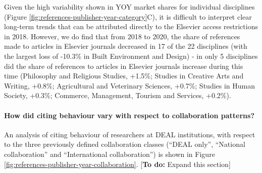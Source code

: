 \documentclass[
]{article}
\begin{document}
Given the high variability shown in YOY market shares for individual disciplines (Figure \ref{fig:references-publisher-year-category}C), it is difficult to interpret clear long-term trends that can be attributed directly to the Elsevier access restrictions in 2018. However, we do find that from 2018 to 2020, the share of references made to articles in Elsevier journals decreased in 17 of the 22 disciplines (with the largest loss of -10.3\% in Built Environment and Design) - in only 5 disciplines did the share of references to articles in Elsevier journals increase during this time (Philosophy and Religious Studies, +1.5\%; Studies in Creative Arts and Writing, +0.8\%; Agricultural and Veterinary Sciences, +0.7\%; Studies in Human Society, +0.3\%; Commerce, Management, Tourism and Services, +0.2\%).

\hypertarget{how-did-citing-behaviour-vary-with-respect-to-collaboration-patterns}{%
\paragraph{How did citing behaviour vary with respect to collaboration patterns?}\label{how-did-citing-behaviour-vary-with-respect-to-collaboration-patterns}}

An analysis of citing behaviour of researchers at DEAL institutions, with respect to the three previously defined collaboration classes (``DEAL only'', ``National collaboration'' and ``International collaboration'') is shown in Figure \ref{fig:references-publisher-year-collaboration}. {[}\textbf{To do:} Expand this section{]}
\end{document}
